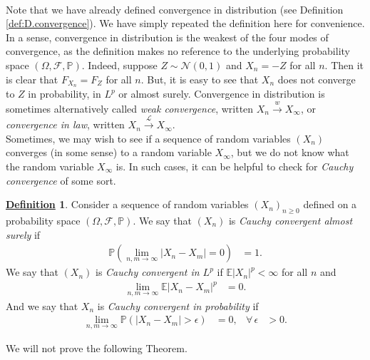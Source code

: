 \documentclass[12pt]{book}
\let\varepsilon\epsilon
\numberwithin{equation}{chapter}
\theoremstyle{plain}
\numberwithin{theorem}{section}
\theoremstyle{definition}
\newtheorem{definition}[theorem]{\underline{Definition}}
\numberwithin{exercise}{chapter}
\newcommand{\<}{\langle}
\renewcommand{\>}{\rangle}
\renewcommand{\(}{\left(}
\renewcommand{\)}{\right)}
\renewcommand{\[}{\left[}
\renewcommand{\]}{\right]}
\newcommand\Eb{\mathds{E}}
\newcommand\Pb{\mathds{P}}
\newcommand\Fc{\mathscr{F}}
\newcommand\Lc{\mathscr{L}}
\newcommand\Nc{\mathscr{N}}
\newcommand\eps{\varepsilon}
\newcommand\Om{\Omega}
\begin{document}
\\[0.5em]
Note that we have already defined convergence in distribution (see Definition \ref{def:D.convergence}).  We have simply repeated the definition here for convenience.  
In a sense, convergence in distribution is the weakest of the four modes of convergence, as the definition makes no reference to the underlying probability space $(\Om,\Fc,\Pb)$.  Indeed, suppose $Z \sim \Nc(0,1)$ and $X_n = - Z$ for all $n$.  Then it is clear that $F_{X_n} = F_Z$ for all $n$.  But, it is easy to see that $X_n$ does not converge to $Z$ in probability, in $L^p$ or almost surely.  Convergence in distribution is sometimes alternatively called \emph{weak convergence}, written $X_n \stackrel{w}{\to} X_\infty$, or \emph{convergence in law}, written $X_n \stackrel{\Lc}{\to} X_\infty$.
\\[0.5em]
Sometimes, we may wish to see if a sequence of random variables $(X_n)$ converges (in some sense) to a random variable $X_\infty$, but we do not know what the random variable $X_\infty$ is.  In such cases, it can be helpful to check for \emph{Cauchy convergence} of some sort.  

\begin{definition}
\label{def:convergence.RVs.cauchy}
Consider a sequence of random variables $(X_n)_{n \geq 0}$ defined on a probability space $(\Om,\Fc,\Pb)$.
We say that $(X_n)$ is \emph{Cauchy convergent almost surely} if
\begin{align}
 \Pb( \lim_{n,m \to \infty} |X_n - X_m| = 0) 
	&= 1 . \label{eq:as.convergence.cauchy}
\end{align}
We say that $(X_n)$ is \emph{Cauchy convergent in $L^p$} if $\Eb | X_n |^p < \infty$ for all $n$ and
\begin{align}
\lim_{n,m \to \infty} \Eb | X_n - X_m |^p 
	&= 0 . \label{eq:lp.convergence.cauchy}
\end{align}
And we say that $X_n$ is \emph{Cauchy convergent in probability} if
\begin{align}
\lim_{n,m \to \infty} \Pb( |X_n - X_m | > \eps ) 
	&=	0 , &
\forall \, \eps
	&> 0 . \label{eq:p.convergence.cauchy}
\end{align}
\end{definition}

\noindent
We will not prove the following Theorem.
\end{document}
